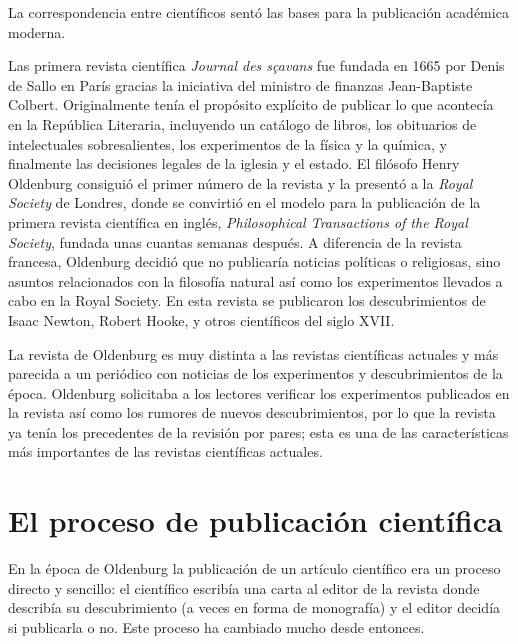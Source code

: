 \begin{remember}
    La correspondencia entre científicos sentó las bases para la publicación
    académica moderna.
\end{remember}

Las primera revista científica \emph{Journal des sçavans} fue fundada en 1665
por Denis de Sallo en París gracias la iniciativa del ministro de finanzas
Jean-Baptiste Colbert.
Originalmente tenía el propósito explícito de publicar lo que acontecía en la
República Literaria, incluyendo un catálogo de libros, los obituarios de
intelectuales sobresalientes, los experimentos de la física y la química, y
finalmente las decisiones legales de la iglesia y el estado\cite{Fyfe2022-ca}.
El filósofo Henry Oldenburg consiguió el primer número de la revista y la
presentó a la \emph{Royal Society} de Londres, donde se convirtió en el modelo
para la publicación de la primera revista científica en inglés,
\emph{Philosophical Transactions of the Royal Society}, fundada unas cuantas
semanas después.
A diferencia de la revista francesa, Oldenburg decidió que no publicaría
noticias políticas o religiosas, sino asuntos relacionados con la filosofía
natural así como los experimentos llevados a cabo en la Royal Society.
En esta revista se publicaron los descubrimientos de Isaac Newton, Robert Hooke,
y otros científicos del siglo XVII.

La revista de Oldenburg es muy distinta a las revistas científicas actuales y
más parecida a un periódico con noticias de los experimentos y descubrimientos
de la época.
Oldenburg solicitaba a los lectores verificar los experimentos publicados en la
revista así como los rumores de nuevos descubrimientos, por lo que la revista
ya tenía los precedentes de la revisión por pares; esta es una de las
características más importantes de las revistas científicas actuales.

\section{El proceso de publicación científica}
\label{sec:procesopublicacion}
En la época de Oldenburg la publicación de un artículo científico era un proceso
directo y sencillo: el científico escribía una carta al editor de la revista
donde describía su descubrimiento (a veces en forma de monografía) y el editor
decidía si publicarla o no.
Este proceso ha cambiado mucho desde entonces.


